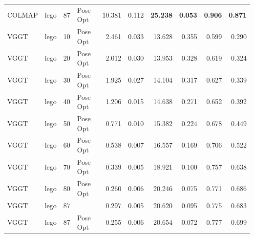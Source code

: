 \begin{table}[H]
\begin{tabular}{llrlrrrrrr}
COLMAP & lego & 87 & Pose Opt & 10.381 & 0.112 & \textbf{25.238} & \textbf{0.053} & \textbf{0.906} & \textbf{0.871} \\
VGGT & lego & 10 & Pose Opt & 2.461 & 0.033 & 13.628 & 0.355 & 0.599 & 0.290 \\
VGGT & lego & 20 & Pose Opt & 2.012 & 0.030 & 13.953 & 0.328 & 0.619 & 0.324 \\
VGGT & lego & 30 & Pose Opt & 1.925 & 0.027 & 14.104 & 0.317 & 0.627 & 0.339 \\
VGGT & lego & 40 & Pose Opt & 1.206 & 0.015 & 14.638 & 0.271 & 0.652 & 0.392 \\
VGGT & lego & 50 & Pose Opt & 0.771 & 0.010 & 15.382 & 0.224 & 0.678 & 0.449 \\
VGGT & lego & 60 & Pose Opt & 0.538 & 0.007 & 16.557 & 0.169 & 0.706 & 0.522 \\
VGGT & lego & 70 & Pose Opt & 0.339 & 0.005 & 18.921 & 0.100 & 0.757 & 0.638 \\
VGGT & lego & 80 & Pose Opt & 0.260 & 0.006 & 20.246 & 0.075 & 0.771 & 0.686 \\
VGGT & lego & 87 &  & 0.297 & 0.005 & 20.620 & 0.095 & 0.775 & 0.683 \\
VGGT & lego & 87 & Pose Opt & 0.255 & 0.006 & 20.654 & 0.072 & 0.777 & 0.699 \\
\bottomrule
\end{tabular}
\end{table}